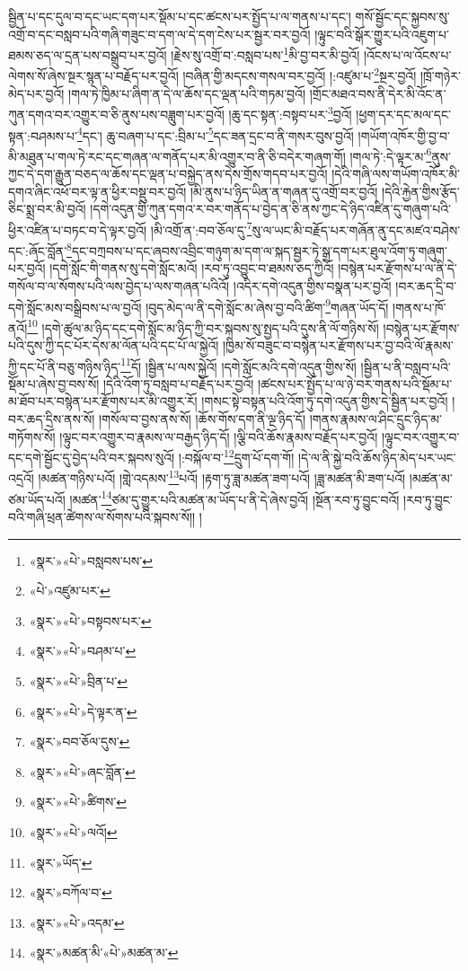 སྦྱིན་པ་དང་དུལ་བ་དང་ཡང་དག་པར་སྡོམ་པ་དང་ཚངས་པར་སྤྱོད་པ་ལ་གནས་པ་དང་། གསོ་སྦྱོང་དང་སྐྱབས་སུ་འགྲོ་བ་དང་བསླབ་པའི་གཞི་གཟུང་བ་དག་ལ་དེ་དག་ངེས་པར་སྦྱར་བར་བྱའོ། །ལྟུང་བའི་སྒོར་གྱུར་པའི་འཇུག་པ་ཐམས་ཅད་ལ་དྲན་པས་བསྒྲུབ་པར་བྱའོ། །རྗེས་སུ་འགྲོ་བ་:བསླབ་པས་\footnote{«སྣར་»«པེ་»བསླབས་པས་}མི་བྱ་བར་མི་བྱའོ། །འོངས་པ་ལ་འོངས་པ་ལེགས་སོ་ཞེས་སྔར་སྙན་པ་བརྗོད་པར་བྱའོ། །བཞིན་གྱི་མདངས་གསལ་བར་བྱའོ། །:འཛུམ་པ་\footnote{«པེ་»འཛུམ་པར་}སྔར་བྱའོ། །ཁྲོ་གཉེར་མེད་པར་བྱའོ། །གལ་ཏེ་ཁྱིམ་པ་ཞིག་ན་དེ་ལ་ཆོས་དང་ལྡན་པའི་གཏམ་བྱའོ། །གྲོང་མཐའ་བས་ནི་དེར་མི་འོང་ན་ཀུན་དགའ་བར་འགྱུར་བ་ཅི་ནུས་པས་བཟླུག་པར་བྱའོ། །ཆུ་དང་སྟན་:བསྟབ་པར་\footnote{«སྣར་»«པེ་»བསྟབས་པར་}བྱའོ། །ཕྱག་དར་དང་མལ་དང་སྟན་:བཤམས་པ་\footnote{«སྣར་»«པེ་»བཤམ་པ་}དང་། ཆུ་བཞག་པ་དང་:བྲིམ་པ་\footnote{«སྣར་»«པེ་»བྲིན་པ་}དང་ཟན་དྲང་བ་ནི་གསར་བུས་བྱའོ། །གཡོག་འཁོར་གྱི་བྱ་བ་མི་མཐུན་པ་གལ་ཏེ་རང་དང་གཞན་ལ་གནོད་པར་མི་འགྱུར་བ་ནི་ཅི་བདེར་གཞག་གོ། །གལ་ཏེ་:དེ་ལྟར་མ་\footnote{«སྣར་»«པེ་»དེ་ལྟར་ན་}ནུས་ཀྱང་དེ་དག་རྒྱུན་བཅད་ལ་ཆོས་དང་ལྡན་པ་བསྐྱེད་ནས་དེས་གྲོས་གདབ་པར་བྱའོ། །དེའི་གཞི་ལས་གཡོག་འཁོར་མི་དགའ་ཞིང་འཕོ་བར་ལྟ་ན་ཕྱིར་བསྡུ་བར་བྱའོ། །མི་ནུས་པ་ཉིད་ཡིན་ན་གཞན་དུ་འགྲོ་བར་བྱའོ། །དེའི་རྐྱེན་གྱིས་རྩོད་ཅིང་སྨྲ་བར་མི་བྱའོ། །དགེ་འདུན་གྱི་ཀུན་དགའ་ར་བར་གནོད་པ་བྱེད་ན་ཅི་ནས་ཀྱང་དེ་ཉིད་འཛིན་དུ་གཞུག་པའི་ཕྱིར་འཛིན་པ་བཏང་བ་དེ་ལྟར་བྱའོ། །མི་འགྲོ་ན་:བབ་ཅོལ་དུ་\footnote{«སྣར་»བབ་ཅོལ་དུས་}སུ་ལ་ཡང་མི་བརྗོད་པར་གཞོན་ནུ་དང་མཛའ་བཤེས་དང་:ཞོང་བློན་\footnote{«སྣར་»«པེ་»ཞང་བློན་}དང་བཀྲབས་པ་དང་ཞབས་འབྲིང་གཉུག་མ་དག་ལ་སྐད་སྦྱར་ཏེ་སྒྲ་དག་པར་ཐུལ་འོག་ཏུ་གཞུག་པར་བྱའོ། །དགེ་སློང་གི་གནས་སུ་དགེ་སློང་མའོ། །རབ་ཏུ་འབྱུང་བ་ཐམས་ཅད་ཀྱིའོ། །བསྙེན་པར་རྫོགས་པ་ལ་ནི་དེ་གསོལ་བ་ལ་སོགས་པའི་ལས་བྱེད་པ་ལས་གཞན་པའིའོ། །འདིར་དགེ་འདུན་གྱིས་བསྣན་པར་བྱའོ། །བར་ཆད་དྲི་བ་དགེ་སློང་མས་བསྒྲིབས་པ་ལ་བྱའོ། །བུད་མེད་ལ་ནི་དགེ་སློང་མ་ཞེས་བྱ་བའི་ཚིག་\footnote{«སྣར་»«པེ་»ཚིགས་}གཞན་ཡོད་དོ། །གནས་པ་ཁོ་ནའོ།\footnote{«སྣར་»«པེ་»ལའོ།} །དགེ་ཚུལ་མ་ཉིད་དང་དགེ་སློང་མ་ཉིད་ཀྱི་བར་སྐབས་སུ་སྤྱད་པའི་དུས་ནི་ལོ་གཉིས་སོ། །བསྙེན་པར་རྫོགས་པའི་དུས་ཀྱི་དང་པོར་དེས་མ་ལོན་པའི་དང་པོ་ལ་སྐྱེའོ། །ཁྱིམ་སོ་བཟུང་བ་བསྙེན་པར་རྫོགས་པར་བྱ་བའི་ལོ་རྣམས་ཀྱི་དང་པོ་ནི་བཅུ་གཉིས་ཉིད་\footnote{«སྣར་»ཡོད་}དོ། །སྦྱིན་པ་ལས་སྐྱེའོ། །དགེ་སློང་མའི་དགེ་འདུན་གྱིས་སོ། །སྦྱིན་པ་ནི་བསླབ་པའི་སྡོམ་པ་ཞེས་བྱ་བས་སོ། །དེའི་འོག་ཏུ་བསླབ་པ་བརྗོད་པར་བྱའོ། །ཚངས་པར་སྤྱོད་པ་ལ་ཉེ་བར་གནས་པའི་སྡོམ་པ་མ་ཐོབ་པར་བསྙེན་པར་རྫོགས་པར་མི་འགྱུར་རོ། །གསང་སྟེ་བསྟན་པའི་འོག་ཏུ་དགེ་འདུན་གྱིས་དེ་སྦྱིན་པར་བྱའོ། །བར་ཆད་དྲིས་ནས་སོ། །གསོལ་བ་བྱས་ནས་སོ། །ཆོས་གོས་དག་ནི་ལྔ་ཉིད་དོ། །གནས་རྣམས་ལ་ཤིང་དྲུང་ཉིད་མ་གཏོགས་སོ། །ལྟུང་བར་འགྱུར་བ་རྣམས་ལ་བརྒྱད་ཉིད་དོ། །ལྕི་བའི་ཆོས་རྣམས་བརྗོད་པར་བྱའོ། །ལྟུང་བར་འགྱུར་བ་དང་དགེ་སྦྱོང་དུ་བྱེད་པའི་བར་སྐབས་སུའོ། །:བསྐོལ་བ་\footnote{«སྣར་»བཀོལ་བ་}དྲུག་པོ་དག་གོ། །དེ་ལ་ནི་སྐྱེ་བའི་ཆོས་ཉིད་མེད་པར་ཡང་འདྲའོ། །མཚན་གཉིས་པའོ། །གླེ་འདམས་\footnote{«སྣར་»«པེ་»འདམ་}པའོ། །རྟག་ཏུ་ཟླ་མཚན་ཟག་པའོ། །ཟླ་མཚན་མི་ཟག་པའོ། །མཚན་མ་ཙམ་ཡོད་པའོ། །མཚན་\footnote{«སྣར་»མཚན་མི་«པེ་»མཚན་མ་}ཙམ་དུ་གྱུར་པའི་མཚན་མ་ཡོད་པ་ནི་དེ་ཞེས་བྱའོ། །སྔོན་རབ་ཏུ་བྱུང་བའོ། །རབ་ཏུ་བྱུང་བའི་གཞི་ཕྲན་ཚེགས་ལ་སོགས་པའི་སྐབས་སོ།། །
